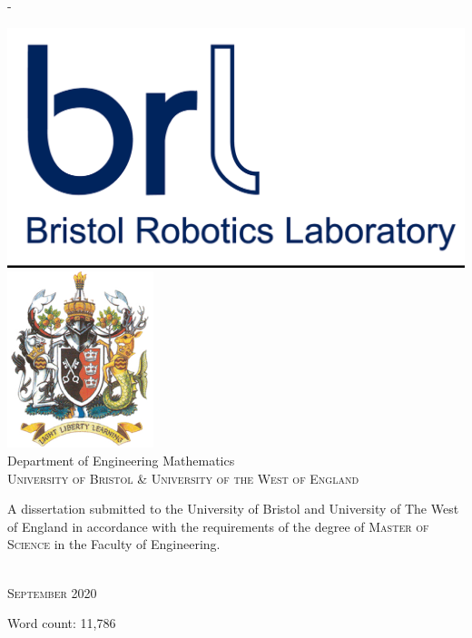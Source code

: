 \begin{titlingpage}
\begin{SingleSpace}
\begin{adjustwidth*}{\unitlength}{-\unitlength}
\begin{center}
\hspace{20mm}
\includegraphics[scale=0.1]{logos/BRL-SNI.png}
\hspace{20mm}
\includegraphics[scale=0.5]{logos/uweCrest.png}\\
\vspace{6mm}
{\large Department of Engineering Mathematics\\
\textsc{University of Bristol \& University of the West of England}}\\
\vspace{11mm}
\begin{minipage}{10cm}
A dissertation submitted to the University of Bristol and University of The West of England in accordance with the requirements of the degree of \textsc{Master of Science} in the Faculty of Engineering.
\end{minipage}\\
\vspace{9mm}
{\large\textsc{September 2020}}
\vspace{12mm}
\end{center}
\begin{flushright}
{\small Word count: 11,786}
\end{flushright}
\end{adjustwidth*}
\end{SingleSpace}
\end{titlingpage}